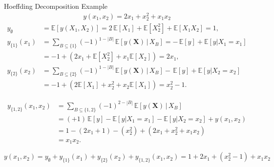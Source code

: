\begin{frame}{Hoeffding Decomposition Example} %
  \begin{align*}
    y(x_1, x_2) = 2x_1 + x_2^{2} + x_1 x_2
  \end{align*}
  \begin{align*}
    y_{\emptyset}
    &= \mathbb{E}[y(X_1,X_2)] 
     = 2\,\mathbb{E}[X_1] + \mathbb{E}[X_2^2] + \mathbb{E}[X_1 X_2] 
     = 1,
    \\[1.2em]
    y_{\{1\}}(x_1)
    &= \sum_{B \subseteq \{1\}} (-1)^{1-|B|}
       \,\mathbb{E}[y(\boldsymbol{X})\,|\,X_B] = -\,\mathbb{E}[y] + \mathbb{E}[y|X_1=x_1] \\[2pt]
    &= -1 + (2x_1 + \mathbb{E}[X_2^2] + x_1\mathbb{E}[X_2]) = 2x_1,
    \\[1.2em]
    y_{\{2\}}(x_2)
    &= \sum_{B \subseteq \{2\}} (-1)^{1-|B|}
       \,\mathbb{E}[y(\boldsymbol{X})\,|\,X_B] -\,\mathbb{E}[y] + \mathbb{E}[y|X_2=x_2] \\[2pt]
    &= -1 + (2\mathbb{E}[X_1] + x_2^2 + x_2\mathbb{E}[X_1]) = x_2^2 - 1.
\end{align*}
\end{frame}

\begin{frame}
  \begin{align*}
    y_{\{1,2\}}(x_1,x_2)
    &= \sum_{B \subseteq \{1,2\}} (-1)^{2-|B|}
       \,\mathbb{E}[y(\boldsymbol{X})\,|\,X_B] \\[2pt]
    &= (+1)\,\mathbb{E}[y] 
     - \mathbb{E}[y|X_1=x_1]
     - \mathbb{E}[y|X_2=x_2]
     + y(x_1,x_2) \\[2pt]
    &= 1 - (2x_1+1) - (x_2^2) + (2x_1+x_2^2+x_1x_2) \\[2pt]
    &= x_1 x_2.
\end{align*}

\[
y(x_1,x_2)
= y_{\emptyset} + y_{\{1\}}(x_1) + y_{\{2\}}(x_2) + y_{\{1,2\}}(x_1,x_2)
= 1 + 2x_1 + (x_2^2 - 1) + x_1 x_2
\]

\end{frame}



